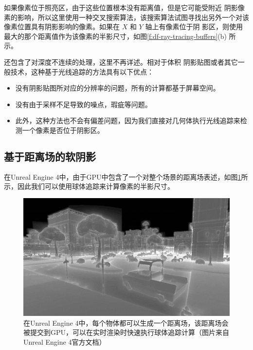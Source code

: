 如果像素位于照亮区，由于这些位置根本没有距离值，但是它可能受附近 阴影像素的影响，所以这里使用一种交叉搜索算法，该搜索算法试图寻找出另外一个对该像素位置具有阴影影响的像素。如果在 $X$ 和 $Y$ 轴上有像素位于阴 影区，则使用最大的那个距离值作为该像素的半影尺寸，如图\ref{f:df-ray-tracing-buffers}(b) 所示。

\cite{a:Implementingfastraytracedsoftshadowsinagameengine}还包含了对深度不连续的处理，这里不再详述。相对于体积 阴影贴图或者其它一般技术，这种基于光线追踪的方法具有以下优点：

\begin{itemize}
	\item 没有阴影贴图所对应的分辨率的问题，所有的计算都基于屏幕空间。
	\item 没有由于采样不足导致的噪点，瑕疵等问题。
	\item 此外，这种方法也不会有偏差问题，因为我们直接对几何体执行光线追踪来检测一个像素是否位于阴影区。
\end{itemize}



\subsection{基于距离场的软阴影}
在Unreal Engine 4中，由于GPU中包含了一个对整个场景的距离场表述，如图\ref{f:df-object-distance-field}所示，因此我们可以使用球体追踪来计算像素的半影尺寸。

\begin{figure}
	\includegraphics[width=\textwidth]{graphics/shadows/VisualizeMeshDistanceFields}
	\caption{在Unreal Engine 4中，每个物体都可以生成一个距离场，该距离场会被提交到GPU，可以在实时渲染时快速执行球体追踪计算（图片来自Unreal Engine 4官方文档）}
	\label{f:df-object-distance-field}
\end{figure}

